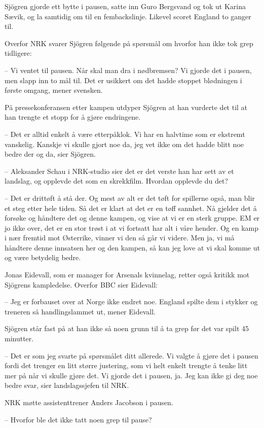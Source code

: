 Sjögren gjorde ett bytte i pausen, satte inn Guro Bergsvand og tok ut Karina Sævik, og la samtidig om til en fembackslinje. Likevel scoret England to ganger til.

Overfor NRK svarer Sjögren følgende på spørsmål om hvorfor han ikke tok grep tidligere:

– Vi ventet til pausen. Når skal man dra i nødbremsen? Vi gjorde det i pausen, men slapp inn to mål til. Det er usikkert om det hadde stoppet blødningen i første omgang, mener svensken.

På pressekonferansen etter kampen utdyper Sjögren at han vurderte det til at han trengte et stopp for å gjøre endringene.

– Det er alltid enkelt å være etterpåklok. Vi har en halvtime som er ekstremt vanskelig. Kanskje vi skulle gjort noe da, jeg vet ikke om det hadde blitt noe bedre der og da, sier Sjögren.

– Aleksander Schau i NRK-studio sier det er det verste han har sett av et landslag, og opplevde det som en skrekkfilm. Hvordan opplevde du det?

– Det er drittøft å stå der. Og mest av alt er det tøft for spillerne også, man blir et steg etter hele tiden. Så det er klart at det er en tøff sannhet. Nå gjelder det å forsøke og håndtere det og denne kampen, og vise at vi er en sterk gruppe. EM er jo ikke over, det er en stor trøst i at vi fortsatt har alt i våre hender. Og en kamp i nær fremtid mot Østerrike, vinner vi den så går vi videre. Men ja, vi må håndtere denne innsatsen her og den kampen, så kan jeg love at vi skal komme ut og være betydelig bedre.

Jonas Eidevall, som er manager for Arsenals kvinnelag, retter også kritikk mot Sjögrens kampledelse. Overfor BBC sier Eidevall:

– Jeg er forbauset over at Norge ikke endret noe. England spilte dem i stykker og treneren så handlingslammet ut, mener Eidevall.

Sjögren står fast på at han ikke så noen grunn til å ta grep før det var spilt 45 minutter.

– Det er som jeg svarte på spørsmålet ditt allerede. Vi valgte å gjøre det i pausen fordi det trenger en litt større justering, som vi helt enkelt trengte å tenke litt mer på når vi skulle gjøre det. Vi gjorde det i pausen, ja. Jeg kan ikke gi deg noe bedre svar, sier landslagssjefen til NRK.

NRK møtte assistenttrener Anders Jacobson i pausen.

– Hvorfor ble det ikke tatt noen grep til pause?

